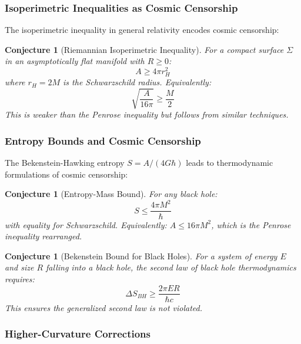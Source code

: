 \documentclass[12pt]{article}
\theoremstyle{plain}
\newtheorem{conjecture}[theorem]{Conjecture}
\theoremstyle{definition}
\theoremstyle{remark}
\begin{document}
\subsubsection{Isoperimetric Inequalities as Cosmic Censorship}

The isoperimetric inequality in general relativity encodes cosmic censorship:

\begin{conjecture}[Riemannian Isoperimetric Inequality]
For a compact surface $\Sigma$ in an asymptotically flat manifold with $R \geq 0$:
\begin{equation}
A \geq 4\pi r_H^2
\end{equation}
where $r_H = 2M$ is the Schwarzschild radius. Equivalently:
\begin{equation}
\sqrt{\frac{A}{16\pi}} \geq \frac{M}{2}
\end{equation}
This is weaker than the Penrose inequality but follows from similar techniques.
\end{conjecture}

\subsubsection{Entropy Bounds and Cosmic Censorship}

The Bekenstein-Hawking entropy $S = A/(4G\hbar)$ leads to thermodynamic formulations of cosmic censorship:

\begin{conjecture}[Entropy-Mass Bound]
For any black hole:
\begin{equation}
S \leq \frac{4\pi M^2}{\hbar}
\end{equation}
with equality for Schwarzschild. Equivalently: $A \leq 16\pi M^2$, which is the Penrose inequality rearranged.
\end{conjecture}

\begin{conjecture}[Bekenstein Bound for Black Holes]
For a system of energy $E$ and size $R$ falling into a black hole, the second law of black hole thermodynamics requires:
\begin{equation}
\Delta S_{BH} \geq \frac{2\pi ER}{\hbar c}
\end{equation}
This ensures the generalized second law is not violated.
\end{conjecture}

\subsubsection{Higher-Curvature Corrections}
\end{document}
